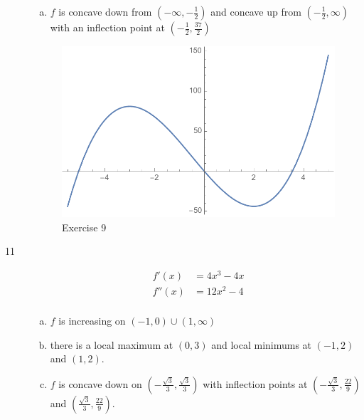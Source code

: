 \documentclass[letterpaper, landscape]{exam}
\begin{document}
\begin{description}
\begin{enumerate}[(a)]
        \item $f$ is concave down from $\left( -\infty, - \frac{1}{2} \right)$ and 
          concave up from $\left( - \frac{1}{2}, \infty \right)$ with an
          inflection point at $\left( -\frac{1}{2}, \frac{37}{2} \right)$
      \end{enumerate}

      \begin{figure}[H]
        \centering
        \includegraphics[scale = 0.6]{ex09.pdf}
        \caption{Exercise 9}
        \label{fig:ex09}
      \end{figure}
      
    \newpage

    \item[11]
      \begin{align*}
        f'(x)  & = 4x^3 - 4x \\
        f''(x) & = 12x^2 - 4 \\
      \end{align*}

      \begin{enumerate}[(a)]
        \item $f$ is increasing on $(-1, 0) \cup (1, \infty)$

        \item there is a local maximum at $(0, 3)$ and local minimums at
          $(-1, 2)$ and $(1, 2)$.

        \item $f$ is concave down on $\left( -\frac{\sqrt{3}}{3}, \frac{\sqrt{3}}{3} \right)$ with
          inflection points at $\left( -\frac{\sqrt{3}}{3}, \frac{22}{9} \right)$ and
          $\left( \frac{\sqrt{3}}{3}, \frac{22}{9} \right)$.

      \end{enumerate}


\end{description}
\end{document}
